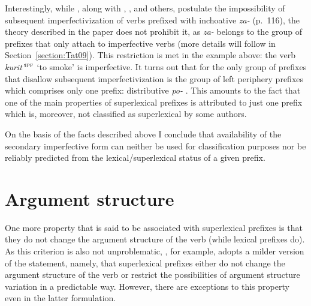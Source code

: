 Interestingly, while \citet{Tatevosov:09}, along with \citet{Svenonius:04b}, \citet{Ramchand:04}, and others, postulate the impossibility of subsequent imperfectivization  of verbs prefixed with inchoative  \textit{za-}   (p.~116), the theory described in the paper does not prohibit it, as \textit{za-}   belongs to the group of prefixes that only attach to imperfective verbs  (more details will follow in Section~\ref{section:Tat09}). This restriction is met in the example above: the verb \textit{kurit'}$^{\textsc{ipf}}$ `to smoke' is imperfective. It turns out that for \citet{Tatevosov:09} the only group of prefixes that disallow subsequent imperfectivization  is the group of left periphery prefixes  which comprises only one prefix: distributive  \textit{po-}  . This amounts to the fact that one of the main properties of superlexical prefixes  is attributed to just one prefix which is, moreover, not classified as superlexical by some authors.

On the basis of the facts described above I conclude that availability of the secondary imperfective  form can neither be used for classification purposes nor be reliably predicted from the lexical/superlexical status of a given prefix.

\section{Argument structure}\label{section:new:argstructure}
One more property that is said to be associated with superlexical prefixes  is that they do not change the argument structure of the verb (while lexical prefixes  do). As this criterion is also not unproblematic, \citet[116]{Tatevosov:09}, for example, adopts a milder version of the statement, namely, that superlexical prefixes  either do not change the argument structure of the verb or restrict the possibilities of argument structure variation in a predictable way. However, there are exceptions to this property even in the latter formulation. 

